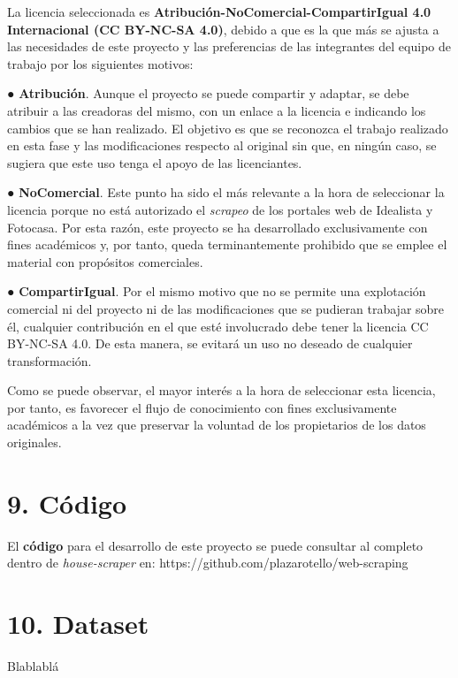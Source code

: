 \documentclass[12pt]{article}
\begin{document}
La licencia seleccionada es\textbf{ Atribución-NoComercial-CompartirIgual 4.0 Internacional (CC BY-NC-SA 4.0)}, debido a que es la que más se ajusta a las necesidades de este proyecto y las preferencias de las integrantes del equipo de trabajo por los siguientes motivos:

● \textbf{Atribución}. Aunque el proyecto se puede compartir y adaptar, se debe atribuir a las creadoras del mismo, con un enlace a la licencia e indicando los cambios que se han realizado. El objetivo es que se reconozca el trabajo realizado en esta fase y las modificaciones respecto al original sin que, en ningún caso, se sugiera que este uso tenga el apoyo de las licenciantes.  

● \textbf{NoComercial}. Este punto ha sido el más relevante a la hora de seleccionar la licencia porque no está autorizado el \textit{scrapeo} de los portales web de Idealista y Fotocasa. Por esta razón, este proyecto se ha desarrollado exclusivamente con fines académicos y, por tanto, queda terminantemente prohibido que se emplee el material con propósitos comerciales. 

● \textbf{CompartirIgual}. Por el mismo motivo que no se permite una explotación comercial ni del proyecto ni de las modificaciones que se pudieran trabajar sobre él, cualquier contribución en el que esté involucrado debe tener la licencia CC BY-NC-SA 4.0. De esta manera, se evitará un uso no deseado de cualquier transformación.

Como se puede observar, el mayor interés a la hora de seleccionar esta licencia, por tanto, es favorecer el flujo de conocimiento con fines exclusivamente académicos a la vez que preservar la voluntad de los propietarios de los datos originales. 

\section*{9. Código }\vspace{-1.5em}

El \textbf{código} para el desarrollo de este proyecto se puede consultar al completo dentro de \textit{house-scraper} en: https://github.com/plazarotello/web-scraping

\section*{10. Dataset }\vspace{-1.5em}

Blablablá
\end{document}
